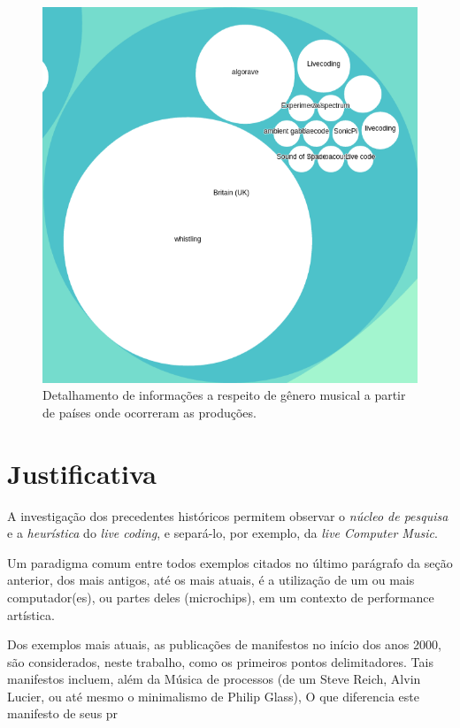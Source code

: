 \begin{figure}
\begin{center}
\includegraphics[scale=0.6]{./imagens/zoomable_circle_packing_genre_year_livecoding4.png}
\caption{Detalhamento de informações a respeito de gênero musical a partir de países onde ocorreram as produções.}
\label{pacotao4}
\end{center}
\end{figure}

\section{Justificativa}

A investigação dos precedentes históricos permitem observar o \emph{núcleo de pesquisa} e a \emph{heurística} \cite{lakatos_falsification_1970,neto_lakatos_2008} do \emph{live coding}, e separá-lo, por exemplo, da \emph{live Computer Music}. 

Um paradigma comum entre todos exemplos citados no último parágrafo da seção anterior, dos mais antigos, até os mais atuais, é a utilização de um ou mais computador(es), ou partes deles (microchips),  em um contexto de performance artística. 

Dos exemplos mais atuais, as publicações de manifestos no início dos anos 2000, são considerados, neste trabalho, como os primeiros pontos delimitadores. Tais manifestos incluem, além da Música de processos (de um Steve Reich, Alvin Lucier, ou até mesmo o minimalismo de Philip Glass), O que diferencia este manifesto de seus pr


